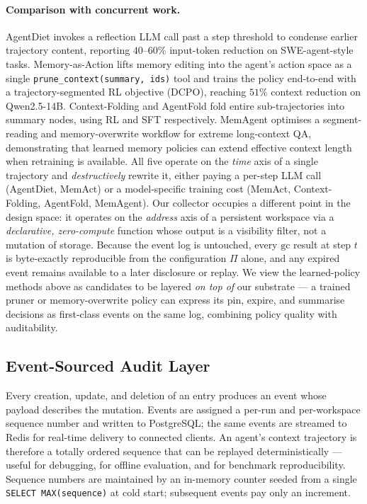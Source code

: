 \paragraph{Comparison with concurrent work.}
AgentDiet \citep{xu2025agentdiet} invokes a reflection LLM call past a
step threshold to condense earlier trajectory content, reporting
$40$--$60\%$ input-token reduction on SWE-agent-style tasks.
Memory-as-Action \citep{zhang2025memact} lifts memory editing into the
agent's action space as a single \texttt{prune\_context(summary, ids)}
tool and trains the policy end-to-end with a trajectory-segmented RL
objective (DCPO), reaching $51\%$ context reduction on Qwen2.5-14B.
Context-Folding \citep{sun2025contextfolding} and AgentFold
\citep{ye2025agentfold} fold entire sub-trajectories into summary
nodes, using RL and SFT respectively. MemAgent
\citep{yu2025memagent} optimises a segment-reading and memory-overwrite
workflow for extreme long-context QA, demonstrating that learned memory
policies can extend effective context length when retraining is
available. All five operate on the
\emph{time} axis of a single trajectory and \emph{destructively} rewrite
it, either paying a per-step LLM call (AgentDiet, MemAct) or a
model-specific training cost (MemAct, Context-Folding, AgentFold,
MemAgent).
Our collector occupies a different point in the design space: it
operates on the \emph{address} axis of a persistent workspace via a
\emph{declarative, zero-compute} function whose output is a visibility
filter, not a mutation of storage. Because the event log is untouched,
every $\mathrm{gc}$ result at step $t$ is byte-exactly reproducible
from the configuration $\Pi$ alone, and any expired event remains
available to a later disclosure or replay. We view the learned-policy
methods above as candidates to be layered \emph{on top of} our
substrate --- a trained pruner or memory-overwrite policy can express
its pin, expire, and summarise decisions as first-class events on the
same log, combining policy quality with auditability.

\subsection{Event-Sourced Audit Layer}
\label{sec:component_c}

Every creation, update, and deletion of an entry produces an event
whose payload describes the mutation. Events are assigned a
per-run and per-workspace sequence number and written to
PostgreSQL; the same events are streamed to Redis for real-time
delivery to connected clients. An agent's context trajectory is
therefore a totally ordered sequence that can be replayed
deterministically --- useful for debugging, for offline evaluation,
and for benchmark reproducibility. Sequence numbers are maintained by
an in-memory counter seeded from a single
\texttt{SELECT MAX(sequence)} at cold start; subsequent events pay
only an increment.

